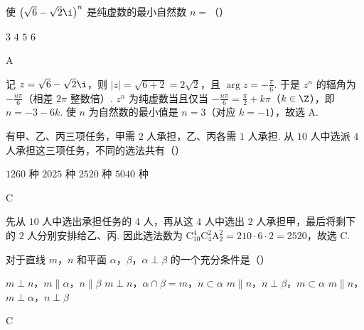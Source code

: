 \documentclass[UTF8,a4paper,oneside,11pt]{ctexbook}
\begin{document}
\begin{problem}
使 \(\left(\sqrt{6} - \sqrt{2}\i\right)^n\) 是纯虚数的最小自然数 \(n =\)（\quad）

\choices
    {\(3\)}
    {\(4\)}
    {\(5\)}
    {\(6\)}
\end{problem}

\begin{answer}
A
\end{answer}

\begin{solution}
记 \(z = \sqrt{6} - \sqrt{2}\i\)，则 \(|z| = \sqrt{6 + 2} = 2\sqrt{2}\)，且 \(\arg z = -\frac{\pi}{6}\). 于是 \(z^n\) 的辐角为 \(-\frac{n\pi}{6}\)（相差 \(2\pi\) 整数倍）. \(z^n\) 为纯虚数当且仅当 \(-\frac{n\pi}{6} = \frac{\pi}{2} + k\pi\)（\(k \in \Z\)），即 \(n = -3 - 6k\). 使 \(n\) 为自然数的最小值是 \(n = 3\)（对应 \(k = -1\)），故选 A.
\end{solution}

\begin{problem}
有甲、乙、丙三项任务，甲需 \(2\) 人承担，乙、丙各需 \(1\) 人承担. 从 \(10\) 人中选派 \(4\) 人承担这三项任务，不同的选法共有（\quad）

\choices
    {\(1260\) 种}
    {\(2025\) 种}
    {\(2520\) 种}
    {\(5040\) 种}
\end{problem}

\begin{answer}
C
\end{answer}

\begin{solution}
先从 \(10\) 人中选出承担任务的 \(4\) 人，再从这 \(4\) 人中选出 \(2\) 人承担甲，最后将剩下的 \(2\) 人分别安排给乙、丙. 因此选法数为 \(\mathrm C_{10}^{4}\mathrm C_{4}^{2}\mathrm A_{2}^{2} = 210 \cdot 6 \cdot 2 = 2520\)，故选 C.
\end{solution}

\begin{problem}
对于直线 \(m\)，\(n\) 和平面 \(\alpha\)，\(\beta\)，\(\alpha \perp \beta\) 的一个充分条件是（\quad）

\choices
    {\(m \perp n\)，\(m \parallel \alpha\)，\(n \parallel \beta\)}
    {\(m \perp n\)，\(\alpha \cap \beta = m\)，\(n \subset \alpha\)}
    {\(m \parallel n\)，\(n \perp \beta\)，\(m \subset \alpha\)}
    {\(m \parallel n\)，\(m \perp \alpha\)，\(n \perp \beta\)}
\end{problem}

\begin{answer}
C
\end{answer}
\end{document}
